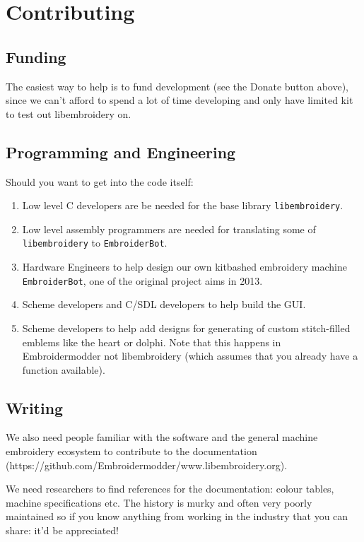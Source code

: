 \documentclass[10pt]{report}
\begin{document}
\section{Contributing}

\subsection{Funding}

The easiest way to help is to fund development (see the Donate button above),
since we can't afford to spend a lot of time developing and only have limited
kit to test out libembroidery on.

\subsection{Programming and Engineering}

Should you want to get into the code itself:

\begin{enumerate}
\item Low level C developers are be needed for the base library \texttt{libembroidery}.
\item Low level assembly programmers are needed for translating some of \texttt{libembroidery} to \texttt{EmbroiderBot}.
\item Hardware Engineers to help design our own kitbashed embroidery machine \texttt{EmbroiderBot}, one of the original project aims in 2013.
\item Scheme developers and C/SDL developers to help build the GUI.
\item Scheme developers to help add designs for generating of custom stitch-filled emblems like the heart or dolphi. Note that this happens in Embroidermodder not libembroidery (which assumes that you already have a function available).
\end{enumerate}

\subsection{Writing}

We also need people familiar with the software and the general
machine embroidery ecosystem to contribute to the
documentation (https://github.com/Embroidermodder/www.libembroidery.org).

We need researchers to find references for the documentation: colour tables,
machine specifications etc. The history is murky and often very poorly maintained
so if you know anything from working in the industry that you can share: it'd be
appreciated!
\end{document}

